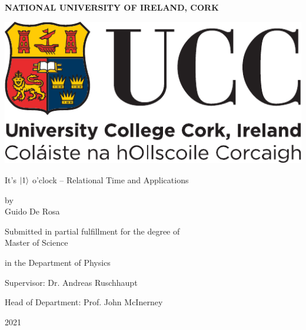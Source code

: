 \thispagestyle{empty}


\begin{centering}

\textbf{NATIONAL UNIVERSITY OF IRELAND, CORK}

\vspace{1cm}

\includegraphics[width=0.333\linewidth]{img/ucc_logo.pdf}

\vspace{0.5in}

\Huge

{It's ${\ket{1}}$ o'clock -- Relational Time and Applications}

\vspace{0.25in}

\Large
by
\\
Guido De Rosa

\vspace{0.5in}

\large

Submitted in partial fulfillment for the degree of\\
Master of Science

in the Department of Physics

\vspace{0.25in}

Supervisor: Dr. Andreas Ruschhaupt

Head of Department: Prof. John McInerney

\vspace{2cm}

\Large
2021

\end{centering}

\clearpage

\thispagestyle{empty}

\cleardoublepage

\restoregeometry
